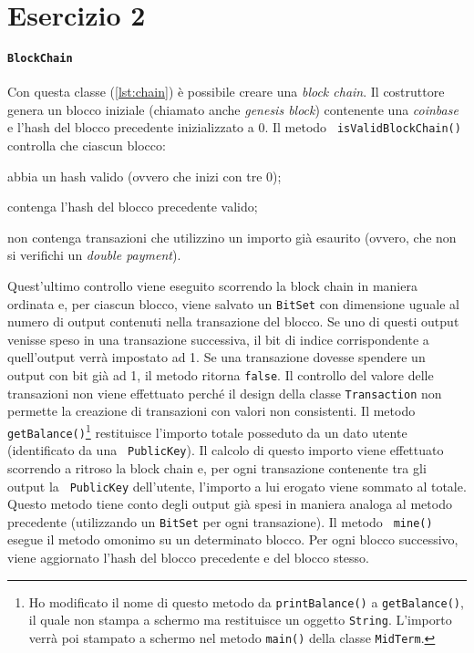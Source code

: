 \section{Esercizio 2}

\paragraph{\texttt{\textbf{BlockChain}}} Con questa classe (\autoref{lst:chain})
è possibile creare una \emph{block chain}. Il costruttore genera un blocco
iniziale (chiamato anche \emph{genesis block}) contenente una \emph{coinbase} e
l'hash del blocco precedente inizializzato a 0. Il metodo {\tt
isValidBlockChain()} controlla che ciascun blocco:
%
\begin{enumerate*}
  \item abbia un hash valido (ovvero che inizi con tre 0);
  \item contenga l'hash del blocco precedente valido;
  \item non contenga transazioni che utilizzino un importo già esaurito (ovvero,
  che non si verifichi un \emph{double payment}).
\end{enumerate*}
%
Quest'ultimo controllo viene eseguito scorrendo la block chain in maniera
ordinata e, per ciascun blocco, viene salvato un {\tt BitSet} con dimensione
uguale al numero di output contenuti nella transazione del blocco. Se uno di
questi output venisse speso in una transazione successiva, il bit di indice
corrispondente a quell'output verrà impostato ad 1. Se una transazione dovesse
spendere un output con bit già ad 1, il metodo ritorna {\tt false}. Il controllo
del valore delle transazioni non viene effettuato perché il design della classe
{\tt Transaction} non permette la creazione di transazioni con valori non
consistenti. Il metodo {\tt getBalance()}\footnote{Ho modificato il nome di
questo metodo da {\tt printBalance()} a {\tt getBalance()}, il quale non stampa
a schermo ma restituisce un oggetto {\tt String}. L'importo verrà poi stampato a
schermo nel metodo {\tt main()} della classe {\tt MidTerm}.} restituisce
l'importo totale posseduto da un dato utente (identificato da una {\tt
PublicKey}). Il calcolo di questo importo viene effettuato scorrendo a ritroso
la block chain e, per ogni transazione contenente tra gli output la {\tt
PublicKey} dell'utente, l'importo a lui erogato viene sommato al totale. Questo
metodo tiene conto degli output già spesi in maniera analoga al metodo
precedente (utilizzando un {\tt BitSet} per ogni transazione). Il metodo {\tt
mine()} esegue il metodo omonimo su un determinato blocco. Per ogni blocco
successivo, viene aggiornato l'hash del blocco precedente e del blocco stesso.
